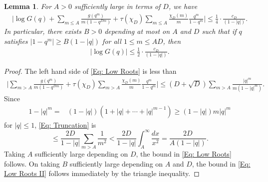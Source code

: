 \documentclass[11pt]{amsart}
\numberwithin{equation}{section}
\newcommand{\mf}{\mathfrak}
\newtheorem{lem}[thm]{Lemma}
\theoremstyle{remark}
\begin{document}
\begin{lem}\label{crude bound lem}
For $A>0$ sufficiently large in terms of $D$, we have  
\begin{align}\label{Eq: Low Roots}
\bigg|\log G(q)+\sum_{m\leq A}\frac{g(q^m)}{m(1-q^{Dm})}
+\tau(\chi_D)\sum_{m\leq A}\frac{\chi_D(m)}{m}\frac{q^m}{1-q^m}\bigg|\leq \frac14\cdot\frac{c_D}{(1-|q|)}.
\end{align}
In particular, there exists $B>0$ depending at most on $A$ and $D$ such that if $q$ satisfies $|1-q^m|\geq B(1-|q|)$ for all $1 \leq m \leq AD$, then
\begin{align}\label{Eq: Low Roots II}
|\log G(q)|\leq\frac12\cdot\frac{c_D}{(1-|q|)}. 
\end{align}
\end{lem}
\begin{proof}
The left hand side of \eqref{Eq: Low Roots} is less than 
\begin{align}\label{Eq: Truncation}
    \bigg \lvert \sum_{m> A}\frac{g(q^m)}{m(1-q^{Dm})}
+\tau(\chi_D)\sum_{m > A}\frac{\chi_D(m)}{m}\frac{q^m}{1-q^m}\bigg \rvert \leq (D+\sqrt{D})\sum_{m> A}\frac{|q|^m}{m(1-|q|^m)}.
\end{align}
Since 
\begin{align*}
1-|q|^m
= &
(1-|q|)(1+|q|+\cdots+|q|^{m-1})
\geq 
(1-|q|)m |q|^m
\end{align*}
for $|q|\leq 1$, \eqref{Eq: Truncation} is
\[
\leq \frac{2D}{1-|q|}\sum_{m>A} \frac{1}{m^2}< \frac{ 2D}{1-|q|}\int_A^\infty \frac{dx}{x^2}
=
\frac{2D}{A(1-|q|)}.
\]
Taking $A$ sufficiently large depending on $D$, the bound in \eqref{Eq: Low Roots} follows. On taking $B$ sufficiently large depending on $A$ and $D$, the bound in \eqref{Eq: Low Roots II} follows immediately by the triangle inequality. 
\end{proof}
\end{document}
